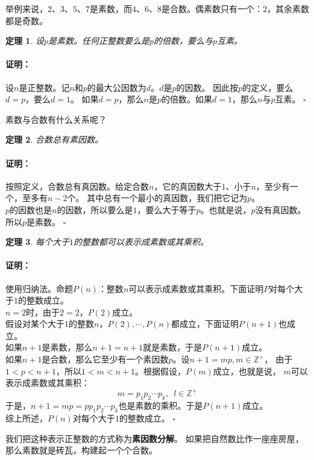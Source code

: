 \documentclass[12pt,UTF8]{ctexbook}
\newtheorem{tm}{定理}[section]
\newenvironment{proof2}{\paragraph{\textbf{证明：}}}{\hfill$\square$}
\begin{document}
举例来说，$2$、$3$、$5$、$7$是素数，而$4$、$6$、$8$是合数。偶素数只有一个：$2$，其余素数都是奇数。

\begin{tm}\label{tm:1-0-0}
    设$p$是素数。任何正整数要么是$p$的倍数，要么与$p$互素。
\end{tm}
\begin{proof2}
    设$n$是正整数。记$n$和$p$的最大公因数为$d$。$d$是$p$的因数。
    因此按$p$的定义，要么$d = p$，要么$d = 1$。
    如果$d = p$，那么$n$是$p$的倍数。如果$d = 1$，那么$n$与$p$互素。
\end{proof2}

素数与合数有什么关系呢？

\begin{tm}\label{tm:1-0-4}
    合数总有素因数。
\end{tm}
\begin{proof2}
    按照定义，合数总有真因数。给定合数$n$，它的真因数大于$1$、小于$n$，至少有一个，至多有$n-2$个。
    其中总有一个最小的真因数，我们把它记为$p$。\\
    $p$的因数也是$n$的因数，所以要么是$1$，要么大于等于$p$。也就是说，$p$没有真因数。所以$p$是素数。
\end{proof2}

\begin{tm}\label{tm:1-0-6}
    每个大于$1$的整数都可以表示成素数或其乘积。
\end{tm}
\begin{proof2}
    使用归纳法。命题$P(n)$：整数$n$可以表示成素数或其乘积。下面证明$P$对每个大于$1$的整数成立。\\
    $n=2$时，由于$2 = 2$，$P(2)$成立。\\
    假设对某个大于$1$的整数$n$，$P(2), \cdots, P(n)$都成立，下面证明$P(n+1)$也成立。\\
    如果$n+1$是素数，那么$n+1 = n+1$就是素数，于是$P(n+1)$成立。\\
    如果$n+1$是合数，那么它至少有一个素因数$p$。设$n+1 = mp, m\in\mathbb{Z}^+$，
    由于$1<p<n+1$，所以$1< m < n+1$。根据假设，$P(m)$成立，也就是说，
    $m$可以表示成素数或其乘积：
    $$ m = p_1 p_2\cdots p_k, \,\,\, l\in\mathbb{Z}^+$$
    于是，$n+1 = mp = pp_1 p_2\cdots p_k$也是素数的乘积。于是$P(n+1)$成立。\\
    综上所述，$P(n)$对每个大于$1$的整数成立。
\end{proof2}

我们把这种表示正整数的方式称为\textbf{素因数分解}。
如果把自然数比作一座座房屋，那么素数就是砖瓦，构建起一个个合数。
\end{document}
